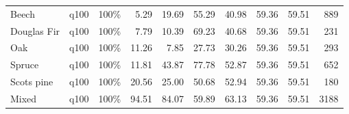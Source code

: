 \begin{longtable}{lllrrrrrrr}
  Beech & q100 & 100\% & 5.29 & 19.69 & 55.29 & 40.98 & 59.36 & 59.51 & 889 \\ 
  Douglas Fir & q100 & 100\% & 7.79 & 10.39 & 69.23 & 40.68 & 59.36 & 59.51 & 231 \\ 
  Oak & q100 & 100\% & 11.26 & 7.85 & 27.73 & 30.26 & 59.36 & 59.51 & 293 \\ 
  Spruce & q100 & 100\% & 11.81 & 43.87 & 77.78 & 52.87 & 59.36 & 59.51 & 652 \\ 
  Scots pine & q100 & 100\% & 20.56 & 25.00 & 50.68 & 52.94 & 59.36 & 59.51 & 180 \\ 
  Mixed & q100 & 100\% & 94.51 & 84.07 & 59.89 & 63.13 & 59.36 & 59.51 & 3188 \\ 
  \hline
\end{longtable}
\endgroup